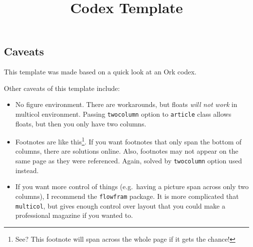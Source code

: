 \documentclass{article}
\begin{document}
\title{Codex Template}
\maketitle
\thispagestyle{fancy} %

\begin{multicols}{3}

\section{Caveats}
\label{sec:caveats}

This template was made based on a quick look at an Ork codex.

Other caveats of this template include:
\begin{itemize}
\item No figure environment. There are workarounds, but floats \emph{will not work} in multicol environment. Passing \verb=twocolumn= option to \verb=article= class allows floats, but then you only have two columns.
\item Footnotes are like this\footnote{See? This footnote will span across the whole page if it gets the chance!}. If you want footnotes that only span the bottom of columns, there are solutions online. Also, footnotes may not appear on the same page as they were referenced. Again, solved by \verb=twocolumn= option used instead.
\item If you want more control of things (e.g.\ having a picture span across only two columns), I recommend the \verb=flowfram= package. It is more complicated that \verb=multicol=, but gives enough control over layout that you could make a professional magazine if you wanted to.
\end{itemize}


\end{multicols}
\end{document}
